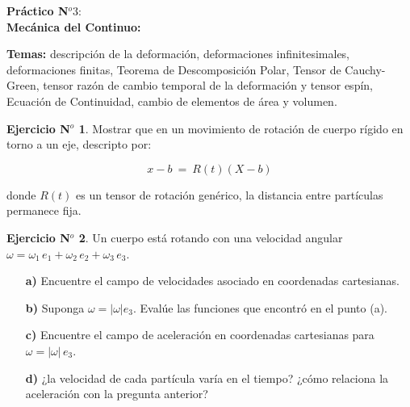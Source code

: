 \documentclass[11pt,a4paper]{article}
\theoremstyle{definition}
\newtheorem{theorem}{Ejercicio N$^o$}
\begin{document}
\begin{center}
{\bf \large Práctico N$^o 3:$ \\
Mecánica del Continuo:}
\end{center}

\noindent \textbf{Temas:} descripción de la deformación, deformaciones infinitesimales, deformaciones finitas, Teorema de Descomposición Polar, Tensor de Cauchy-Green, tensor razón de cambio temporal de la deformación y tensor espín, Ecuación de Continuidad, cambio de elementos de área y volumen.

\medskip


\begin{theorem}

Mostrar que en un movimiento de rotación de cuerpo rígido en torno a un eje, descripto por:

\[
x-b  \: = \: R(t)(X-b)
\]

\noindent donde $R(t)$ es un tensor de rotación genérico, la distancia entre partículas permanece fija. 
\end{theorem}

\medskip


\begin{theorem}

Un cuerpo está rotando con una velocidad angular $\omega = \omega_1 \, e_1 + \omega_2 \, e_2 + \omega_3 \,e_3$.

\begin{itemize}
\item[\textbf{a)}] Encuentre el campo de velocidades asociado en coordenadas cartesianas.
\item[\textbf{b)}] Suponga $\omega = |\omega| e_3$. Evalúe las funciones que encontró en el punto (a).
\item[\textbf{c)}] Encuentre el campo de aceleración en coordenadas cartesianas para \linebreak $\omega = |\omega| \, e_3$.
\item[\textbf{d)}] ¿la velocidad de cada partícula varía en el tiempo? ¿cómo relaciona la aceleración con la pregunta anterior? 
\end{itemize}
\end{theorem}

\medskip
\end{document}
